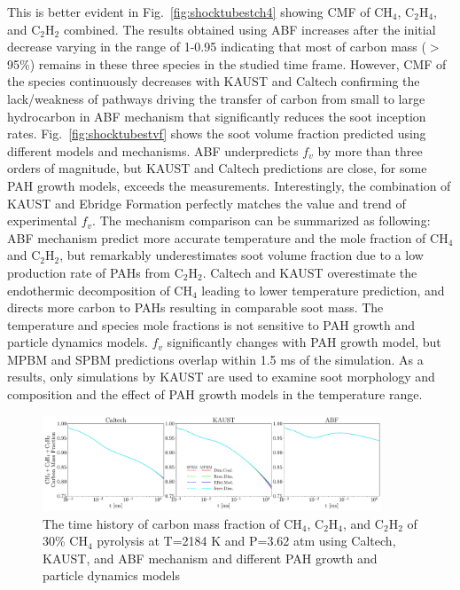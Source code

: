 This is better evident in Fig.~\ref{fig:shocktubestch4} showing CMF of $\mathrm{CH_4}$, $\mathrm{C_2H_4}$, and $\mathrm{C_2H_2}$ combined. The results obtained using ABF increases after the initial decrease varying in the range of 1-0.95 indicating that most of carbon mass ($>$95\%) remains in these three species in the studied time frame. However, CMF of the species continuously decreases with KAUST and Caltech confirming the lack/weakness of pathways driving the transfer of carbon from small to large hydrocarbon in ABF mechanism that significantly reduces the soot inception rates. Fig.~\ref{fig:shocktubestvf} shows the soot volume fraction predicted using different models and mechanisms. ABF underpredicts $f_v$ by more than three orders of magnitude, but KAUST and Caltech predictions are close, for some PAH growth models, exceeds the measurements. Interestingly, the combination of KAUST and Ebridge Formation perfectly matches the value and trend of experimental $f_v$. The mechanism comparison can be summarized as following: ABF mechanism predict more accurate temperature and the mole fraction of $\mathrm{CH_4}$ and $\mathrm{C_2H_2}$, but remarkably underestimates soot volume fraction due to a low production rate of PAHs from $\mathrm{C_2H_2}$. Caltech and KAUST overestimate the endothermic decomposition of $\mathrm{CH_4}$ leading to lower temperature prediction, and directs more carbon to PAHs resulting in comparable soot mass. The temperature and species mole fractions is not sensitive to PAH growth and particle dynamics models. $f_v$ significantly changes with PAH growth model, but MPBM and SPBM predictions overlap within 1.5 ms of the simulation. As a results, only simulations by KAUST are used to examine soot morphology and composition and the effect of PAH growth models in the temperature range. 

\begin{figure}[H]
	\centering
	\includegraphics[width=0.9\textwidth]{Figures/Results/Shocktube/Stanford/june/stsh_mech_compare_CCC.pdf}
	\caption{The time history of carbon mass fraction of $\mathrm{CH_4}$, $\mathrm{C_2H_4}$, and $\mathrm{C_2H_2}$ of 30\% $\mathrm{CH_4}$ pyrolysis at T=2184 K and P=3.62 atm using Caltech, KAUST, and ABF mechanism and different PAH growth and particle dynamics models}
	\label{fig:shocktubestccc} 
\end{figure}


